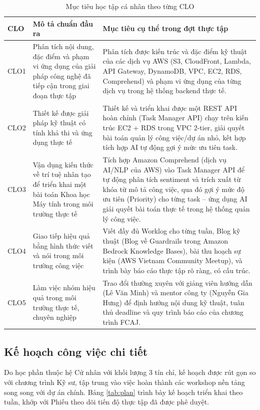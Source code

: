 \documentclass[13pt]{extarticle}
\newcommand{\gvhd}{Lê Văn Minh}
\newcommand{\mentorCT}{Nguyễn Gia Hưng}
\begin{document}
\begin{longtable}{p{1.5cm}p{5cm}p{7.5cm}}
\caption{Mục tiêu học tập cá nhân theo từng CLO}
\label{tab:clo-goals} \\
\toprule
\textbf{CLO} & \textbf{Mô tả chuẩn đầu ra} & \textbf{Mục tiêu cụ thể trong đợt thực tập} \\
\midrule
\endhead
CLO1 & Phân tích nội dung, đặc điểm và phạm vi ứng dụng của giải pháp công
nghệ đã tiếp cận trong giai đoạn thực tập &
Phân tích được kiến trúc và đặc điểm kỹ thuật của các dịch vụ AWS (S3,
CloudFront, Lambda, API Gateway, DynamoDB, VPC, EC2, RDS, Comprehend) và phạm vi ứng dụng
của từng dịch vụ trong hệ thống backend thực tế. \\
CLO2 & Thiết kế được giải pháp kỹ thuật có tính khả thi và ứng dụng thực tế
&
Thiết kế và triển khai được một REST API hoàn chỉnh (Task Manager API) chạy
trên kiến trúc EC2 + RDS trong VPC 2-tier, giải quyết bài toán quản lý công việc/dự án nhỏ,
kết hợp tích hợp AI tự động gợi ý mức ưu tiên task. \\
CLO3 & Vận dụng kiến thức về trí tuệ nhân tạo để triển khai một bài toán
Khoa học Máy tính trong môi trường thực tế &
Tích hợp Amazon Comprehend (dịch vụ AI/NLP của AWS) vào Task Manager API để
tự động phân tích sentiment và trích xuất từ khóa từ mô tả công việc, qua đó
gợi ý mức độ ưu tiên (Priority) cho từng task -- ứng dụng AI giải quyết bài
toán thực tế trong hệ thống quản lý công việc. \\
CLO4 & Giao tiếp hiệu quả bằng hình thức viết và nói trong môi trường công
việc &
Viết đầy đủ Worklog cho từng tuần, Blog kỹ thuật (Blog về Guardrails trong Amazon Bedrock Knowledge Bases),
bài thu hoạch sự kiện (AWS Vietnam Community Meetup), và trình bày báo cáo
thực tập rõ ràng, có cấu trúc. \\
CLO5 & Làm việc nhóm hiệu quả trong môi trường thực tế, chuyên nghiệp &
Trao đổi thường xuyên với giảng viên hướng dẫn (\gvhd) và mentor công ty
(\mentorCT) để định hướng nội dung kỹ thuật, tuân thủ deadline và quy trình
báo cáo của chương trình FCAJ. \\
\bottomrule
\end{longtable}

\subsection{Kế hoạch công việc chi tiết}

Do học phần thuộc hệ Cử nhân với khối lượng 3 tín chỉ, kế hoạch được rút gọn
so với chương trình Kỹ sư, tập trung vào việc hoàn thành các workshop nền tảng
song song với dự án chính. Bảng \ref{tab:plan} trình bày kế hoạch triển khai
theo tuần, khớp với Phiếu theo dõi tiến độ thực tập đã được phê duyệt.
\end{document}
